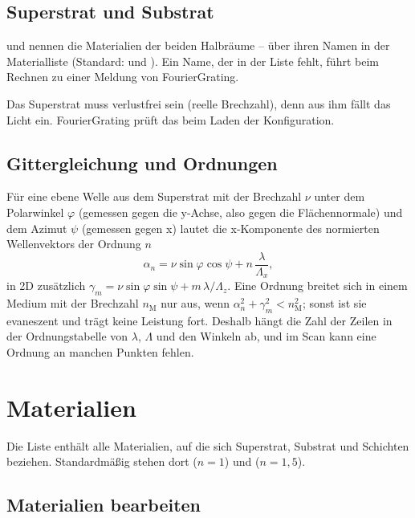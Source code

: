 \subsection{Superstrat und Substrat}

 und  nennen die Materialien der beiden Halbräume -- über ihren
Namen in der Materialliste (Standard:  und ). Ein Name, der in der Liste
fehlt, führt beim Rechnen zu einer Meldung von FourierGrating.

\begin{warnung}
Das Superstrat muss verlustfrei sein (reelle Brechzahl), denn aus ihm fällt das Licht ein.
FourierGrating prüft das beim Laden der Konfiguration.
\end{warnung}

\subsection{Gittergleichung und Ordnungen}\label{sec:fg-gittergleichung}

Für eine ebene Welle aus dem Superstrat mit der Brechzahl $\nu$ unter dem Polarwinkel $\varphi$
(gemessen gegen die y-Achse, also gegen die Flächennormale) und dem Azimut $\psi$ (gemessen gegen
x) lautet die x-Komponente des normierten Wellenvektors der Ordnung $n$
\[
  \alpha_n = \nu \sin\varphi \cos\psi + n\,\frac{\lambda}{\Lambda_x},
\]
in 2D zusätzlich $\gamma_m = \nu \sin\varphi \sin\psi + m\,\lambda/\Lambda_z$. Eine Ordnung
breitet sich in einem Medium mit der Brechzahl $n_\text{M}$ nur aus, wenn
$\alpha_n^2 + \gamma_m^2 < n_\text{M}^2$; sonst ist sie evaneszent und trägt keine Leistung fort.
Deshalb hängt die Zahl der Zeilen in der Ordnungstabelle von $\lambda$, $\Lambda$ und den Winkeln
ab, und im Scan kann eine Ordnung an manchen Punkten fehlen.

\section{Materialien}\label{sec:fg-materialien}

Die Liste  enthält alle Materialien, auf die sich Superstrat, Substrat und Schichten
beziehen. Standardmäßig stehen dort  ($n = 1$) und  ($n = 1{,}5$).

\subsection{Materialien bearbeiten}

